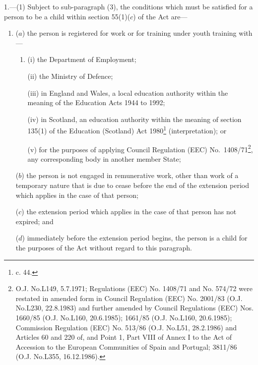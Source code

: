 \documentclass[a4paper]{article}
\begin{document}
1.—(1) Subject to sub-paragraph (3), the conditions which must be satisfied for a person to be a child within section 55(1)($c$) of the Act are—
\begin{enumerate}\item[]
($a$) the person is registered for work or for training under youth training with—
\begin{enumerate}\item[]
(i) the Department of Employment;

(ii) the Ministry of Defence;

(iii) in England and Wales, a local education authority within the meaning of the Education Acts 1944 to 1992;

(iv) in Scotland, an education authority within the meaning of section 135(1) of the Education (Scotland) Act 1980\footnote{ c. 44.} (interpretation); or

(v) for the purposes of applying Council Regulation (EEC)
No.\ 1408/\hspace{0pt}71\footnote{\frenchspacing O.J. No.L149, 5.7.1971; Regulations (EEC) No. 1408/71 and No. 574/72 were restated in amended form in Council Regulation (EEC) No. 2001/83 (O.J. No.L230, 22.8.1983) and further amended by Council Regulations (EEC) Nos. 1660/85 (O.J. No.L160, 20.6.1985); 1661/85 (O.J. No.L160, 20.6.1985); Commission Regulation (EEC) No. 513/86 (O.J. No.L51, 28.2.1986) and Articles 60 and 220 of, and Point 1, Part VIII of Annex I to the Act of Accession to the European Communities of Spain and Portugal; 3811/86 (O.J. No.L355, 16.12.1986).}, any corresponding body in another member State;
\end{enumerate}

($b$) the person is not engaged in remunerative work, other than work of a temporary nature that is due to cease before the end of the extension period which applies in the case of that person;

($c$) the extension period which applies in the case of that person has not expired; and

($d$) immediately before the extension period begins, the person is a child for the purposes of the Act without regard to this paragraph.
\end{enumerate}
\end{document}

